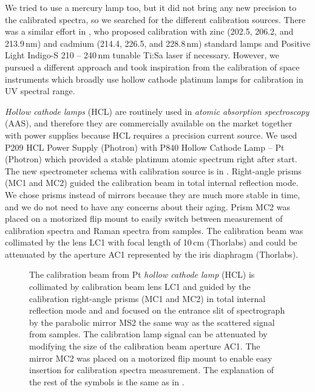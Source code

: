 We tried to use a mercury lamp too, but it did not bring any new precision to
the calibrated spectra, so we searched for the different calibration sources.
There was a similar effort in
\textcite{Wert2014},
who proposed calibration with zinc (202.5, 206.2, and 213.9\,nm) and cadmium
(214.4, 226.5, and 228.8\,nm) standard lamps and Positive Light
Indigo-S 210 -- 240\,nm tunable Ti:Sa laser if necessary.
However, we pursued a different approach and took inspiration from the
calibration of space instruments which broadly use hollow cathode platinum
lamps
\parencite{%
	Mount1977,%
	Reader1990,%
	Sansonetti1992%
}
for calibration in UV spectral range.

\emph{Hollow cathode lamps} (HCL) are routinely used in \emph{atomic absorption
spectroscopy} (AAS), and therefore they are commercially available on the
market together with power supplies because HCL requires a precision current
source.
We used P209 HCL Power Supply (Photron) with P840 Hollow Cathode Lamp -- Pt
(Photron) which provided a stable platinum atomic spectrum right after start.
The new spectrometer schema with calibration source is in
.
Right-angle prisms (MC1 and MC2) guided the calibration beam in total internal
reflection mode.
We chose prisms instead of mirrors because they are much more stable in time,
and we do not need to have any concerns about their aging.
Prism MC2 was placed on a motorized flip mount to easily switch between
measurement of calibration spectra and Raman spectra from samples.
The calibration beam was collimated by the lens LC1 with focal length of
10\,cm (Thorlabs) and could be attenuated by the aperture AC1 represented by
the iris diaphragm (Thorlabs).

\begin{figure}
	\centering
	
	\caption[%
		Top-view schema of the apparatus with wavenumber calibration lamp
		and with side-view inset of the sample space.%
	]{%
		The calibration beam from Pt \emph{hollow cathode lamp} (HCL) is collimated
		by calibration beam lens LC1 and guided by the calibration right-angle
		prisms (MC1 and MC2) in total internal reflection mode and and focused on
		the entrance slit of spectrograph by the parabolic mirror MS2 the same way
		as the scattered signal from samples.
		The calibration lamp signal can be attenuated by modifying the size of the
		calibration beam aperture AC1.
		The mirror MC2 was placed on a motorized flip mount to enable easy
		insertion for calibration spectra measurement.
		The explanation of the rest of the symbols is the same as in
		.
	}
	\label{\figlabel{wavenumber_calibration:apparatus_schema}}
\end{figure}

